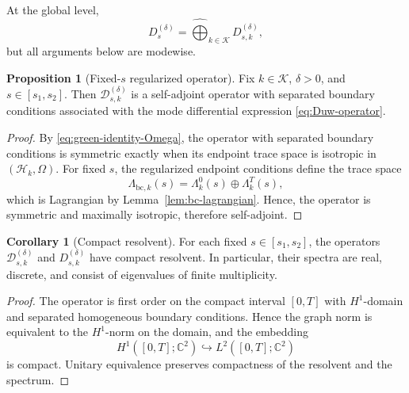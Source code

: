 \documentclass[11pt]{article}
\theoremstyle{definition}
\newtheorem{proposition}[theorem]{Proposition}
\newtheorem{corollary}[theorem]{Corollary}
\numberwithin{equation}{section}
\begin{document}
At the global level,
\begin{equation}\label{eq:global-regularized-decomposition}
D^{(\delta)}_{s}
=
\widehat{\bigoplus}_{k\in\mathcal K} D^{(\delta)}_{s,k},
\end{equation}
but all arguments below are modewise.

\begin{proposition}[Fixed-\texorpdfstring{$s$}{s} regularized operator]
\label{prop:fixed-s-selfadjoint}
Fix \(k\in\mathcal K\), \(\delta>0\), and \(s\in[s_1,s_2]\). Then \(\mathcal D^{(\delta)}_{s,k}\) is a self-adjoint operator with separated boundary conditions associated with the mode differential expression \eqref{eq:Duw-operator}.
\end{proposition}

\begin{proof}
By \eqref{eq:green-identity-Omega}, the operator with separated boundary conditions is symmetric exactly when its endpoint trace space is isotropic in \((\mathcal H_k,\Omega)\). For fixed \(s\), the regularized endpoint conditions define the trace space
\begin{equation}
\Lambda_{\mathrm{bc},k}(s)=\Lambda_k^0(s)\oplus\Lambda_k^T(s),
\end{equation}
which is Lagrangian by Lemma~\ref{lem:bc-lagrangian}. Hence, the operator is symmetric and maximally isotropic, therefore self-adjoint.
\end{proof}

\begin{corollary}[Compact resolvent]
\label{cor:compact-resolvent-regularized}
For each fixed \(s\in[s_1,s_2]\), the operators \(\mathcal D^{(\delta)}_{s,k}\) and \(D^{(\delta)}_{s,k}\) have compact resolvent. In particular, their spectra are real, discrete, and consist of eigenvalues of finite multiplicity.
\end{corollary}

\begin{proof}
The operator is first order on the compact interval \([0,T]\) with \(H^1\)-domain and separated homogeneous boundary conditions. Hence the graph norm is equivalent to the \(H^1\)-norm on the domain, and the embedding
\begin{equation}
H^1([0,T];\mathbb C^2)\hookrightarrow L^2([0,T];\mathbb C^2)
\end{equation}
is compact. Unitary equivalence preserves compactness of the resolvent and the spectrum.
\end{proof}
\end{document}
